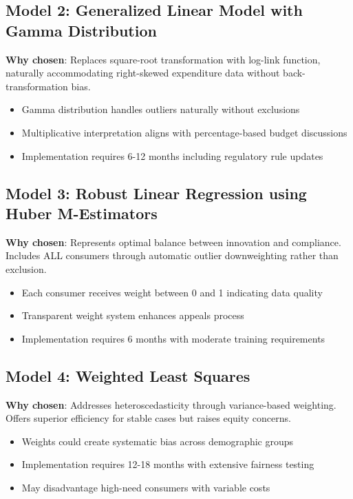 \subsection{Model 2: Generalized Linear Model with Gamma Distribution}
\textbf{Why chosen}: Replaces square-root transformation with log-link function, naturally accommodating right-skewed expenditure data without back-transformation bias.
\begin{itemize}
    \item Gamma distribution handles outliers naturally without exclusions
    \item Multiplicative interpretation aligns with percentage-based budget discussions
    \item Implementation requires 6-12 months including regulatory rule updates
\end{itemize}

\subsection{Model 3: Robust Linear Regression using Huber M-Estimators}
\textbf{Why chosen}: Represents optimal balance between innovation and compliance. Includes ALL consumers through automatic outlier downweighting rather than exclusion.
\begin{itemize}
    \item Each consumer receives weight between 0 and 1 indicating data quality
    \item Transparent weight system enhances appeals process
    \item Implementation requires 6 months with moderate training requirements
\end{itemize}

\subsection{Model 4: Weighted Least Squares}
\textbf{Why chosen}: Addresses heteroscedasticity through variance-based weighting. Offers superior efficiency for stable cases but raises equity concerns.
\begin{itemize}
    \item Weights could create systematic bias across demographic groups
    \item Implementation requires 12-18 months with extensive fairness testing
    \item May disadvantage high-need consumers with variable costs
\end{itemize}

